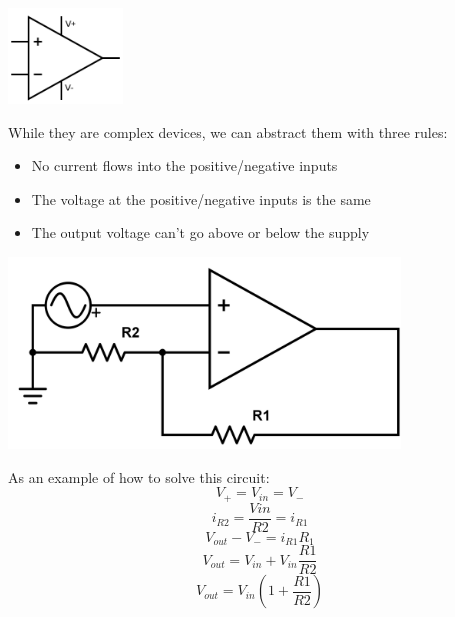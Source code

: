 \documentclass[12pt]{article}
\begin{document}
\begin{center}
	\includegraphics[height=1in]{assets/ece210-opamp5.png}
\end{center}

While they are complex devices, we can abstract them with three rules:

\begin{itemize}
	\item No current flows into the positive/negative inputs
	\item The voltage at the positive/negative inputs is the same
	\item The output voltage can't go above or below the supply
\end{itemize}

\begin{center}
	\includegraphics[height=2in]{assets/ece210-opamp-circuit.png}
\end{center}

As an example of how to solve this circuit:
\[ V_+  = V_{in} = V_- \]
\[ i_{R2} = \dfrac{Vin}{R2} = i_{R1} \]
\[ V_{out} - V_- = i_{R1} R_1 \]
\[ V_{out} = V_{in} + V_{in}\dfrac{R1}{R2} \]
\[ V_{out} = V_{in} \left( 1 + \dfrac{R1}{R2} \right) \]

\end{document}
